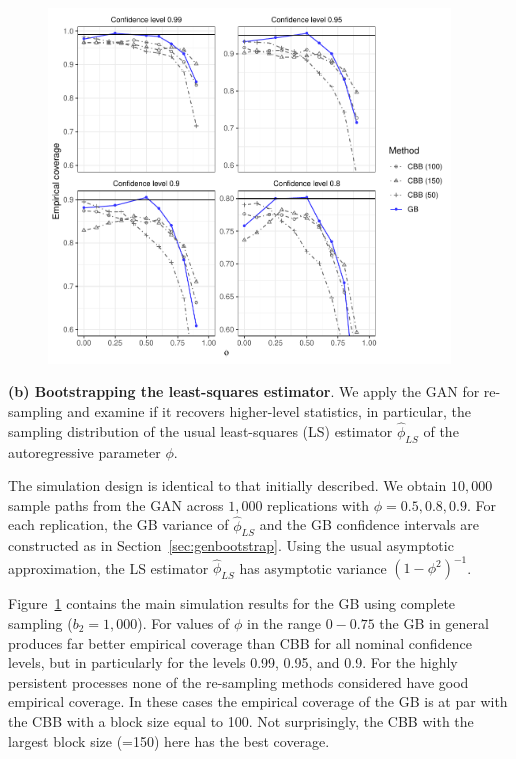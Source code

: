 \documentclass[12pt]{article}
\begin{document}
\begin{figure}[t!]
\begin{center}
\includegraphics[width=0.95\textwidth]{cbb_perf_gb2.pdf}
\label{fig:blocksizes}
\end{center}
\end{figure}

\textbf{(b) Bootstrapping the least-squares estimator}. We apply the GAN for re-sampling and examine if it recovers higher-level statistics, in particular, the sampling distribution of the usual least-squares (LS) estimator $\hat\phi_{LS}$ of the autoregressive parameter $\phi$. %

The simulation design is identical to that initially described. We obtain $10,000$ sample paths from the GAN across $1,000$ replications with $\phi = 0.5, 0.8, 0.9$. For each replication, the GB variance of $\hat{\phi}_{LS}$ and the GB confidence intervals are constructed as in Section~\ref{sec:genbootstrap}. Using the usual asymptotic approximation, the LS estimator $\hat{\phi}_{LS}$ has asymptotic variance $(1-\phi^2)^{-1}$. 

Figure~\ref{fig:blocksizes} contains the main simulation results for the GB using complete sampling ($b_2 = 1,000$). For values of $\phi$ in the range $0-0.75$ the GB in general produces far better empirical coverage than CBB for all nominal confidence levels, but in particularly for the levels 0.99, 0.95, and 0.9. For the highly persistent processes none of the re-sampling methods considered have good empirical coverage. In these cases the empirical coverage of the GB is at par with the CBB with a block size equal to 100. Not surprisingly, the CBB with the largest block size (=150) here has the best coverage.   
\end{document}
